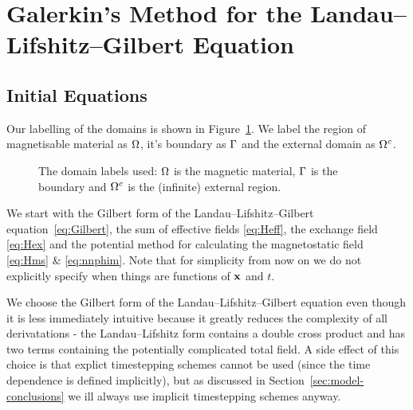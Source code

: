 
\newcommand{\skewop}{\text{\Large{$\Lambda$}}}
\newcommand{\skewm}[1]{\skewop\left[ #1 \right]}
\newcommand{\crossop}[2]{\skewm{#1} \cdot \left( #2 \right)}


\section{Galerkin's Method for the Landau--Lifshitz--Gilbert Equation}
\label{sec:galerk-meth-llg}

\subsection{Initial Equations}

Our labelling of the domains is shown in Figure~\ref{fig:domain_labels}. We label the region of magnetisable material as $\Omega$, it's boundary as ${\Gamma}$ and the external domain as ${\Omega^c}$.

\begin{figure}[!ht]
  \center
  \caption{The domain labels used: $\Omega$ is the magnetic material, ${\Gamma}$ is the boundary and ${\Omega^c}$ is the (infinite) external region.} \label{fig:domain_labels}
\end{figure}

We start with the Gilbert form of the Landau--Lifshitz--Gilbert equation~\eqref{eq:Gilbert}, the sum of effective fields \eqref{eq:Heff}, the exchange field \eqref{eq:Hex} and the potential method for calculating the magnetostatic field \eqref{eq:Hms} \& \eqref{eq:nnphim}. Note that for simplicity from now on we do not explicitly specify when things are functions of $\mathbf{x}$ and $t$.

We choose the Gilbert form of the Landau--Lifshitz--Gilbert equation even though it is less immediately intuitive because it greatly reduces the complexity of all derivatations - the Landau--Lifshitz form contains a double cross product and has two terms containing the potentially complicated total field. A side effect of this choice is that explict timestepping schemes cannot be used (since the time dependence is defined implicitly), but as discussed in Section~\ref{sec:model-conclusions} we ill always use implicit timestepping schemes anyway.

